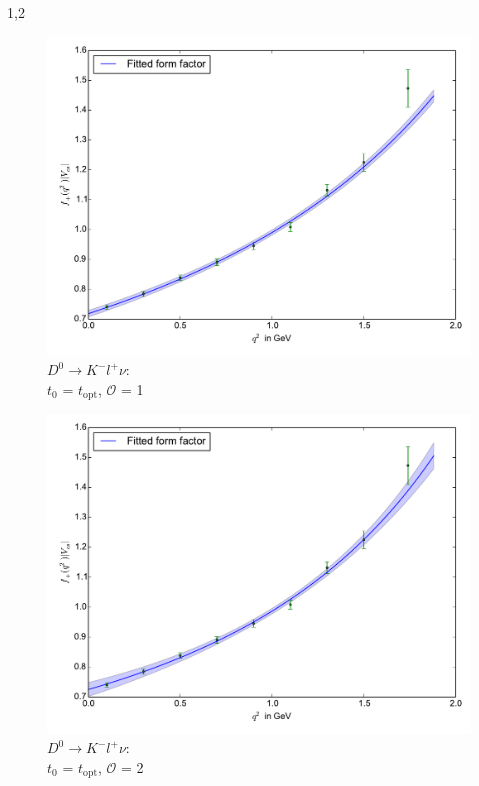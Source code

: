 \documentclass[11pt,a4paper,twoside]{report}
\begin{document}
\begin{spacing}{1,2}
 \begin{minipage}[H]{0.45\textwidth}
 \begin{figure}[H]
 \includegraphics[width=1\textwidth]{Fit/D0-1Ord-t0.pdf}
 \caption{$D^0\rightarrow K^- l^+ \nu$: \\$t_0$ = $t_{\text{opt}}$, $\mathcal{O}$ = 1}
 \label{pic_D0-1Ord-t0}
 \end{figure}
 \end{minipage}
 \hfill
 \begin{minipage}[H]{0.45\textwidth}
 \begin{figure}[H]
 \includegraphics[width=1\textwidth]{Fit/D0-2Ord-t0.pdf}
 \caption{$D^0\rightarrow K^- l^+ \nu$: \\$t_0$ = $t_{\text{opt}}$, $\mathcal{O}$ = 2}
 \label{pic_D0-2Ord-t0}
 \end{figure}
 \end{minipage}
 

\end{spacing}
\end{document}
